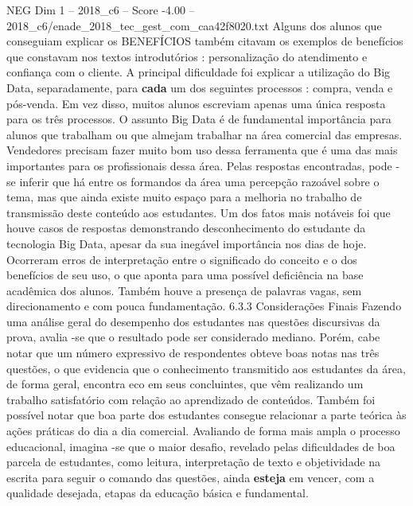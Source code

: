 \begin{textsample}{NEG Dim 1 – 2018\_c6 – Score -4.00 – 2018\_c6/enade\_2018\_tec\_gest\_com\_caa42f8020.txt}
Alguns dos alunos que conseguiam explicar os BENEFÍCIOS também citavam os exemplos de benefícios que constavam nos textos introdutórios : personalização do atendimento e confiança com o cliente.
A principal dificuldade foi explicar a utilização do Big Data, separadamente, para \textbf{cada} um dos seguintes processos : compra, venda e pós-venda.
Em vez disso, muitos alunos escreviam apenas uma única resposta para os três processos.
O assunto Big Data é de fundamental importância para alunos que trabalham ou que almejam trabalhar na área comercial das empresas.
Vendedores precisam fazer muito bom uso dessa ferramenta que é uma das mais importantes para os profissionais dessa área.
Pelas respostas encontradas, pode -se inferir que há entre os formandos da área uma percepção razoável sobre o tema, mas que ainda existe muito espaço para a melhoria no trabalho de transmissão deste conteúdo aos estudantes.
Um dos fatos mais notáveis foi que houve casos de respostas demonstrando desconhecimento do estudante da tecnologia Big Data, apesar da sua inegável importância nos dias de hoje.
Ocorreram erros de interpretação entre o significado do conceito e o dos benefícios de seu uso, o que aponta para uma possível deficiência na base acadêmica dos alunos.
Também houve a presença de palavras vagas, sem direcionamento e com pouca fundamentação. 6.3.3 Considerações Finais Fazendo uma análise geral do desempenho dos estudantes nas questões discursivas da prova, avalia -se que o resultado pode ser considerado mediano.
Porém, cabe notar que um número expressivo de respondentes obteve boas notas nas três questões, o que evidencia que o conhecimento transmitido aos estudantes da área, de forma geral, encontra eco em seus concluintes, que vêm realizando um trabalho satisfatório com relação ao aprendizado de conteúdos.
Também foi possível notar que boa parte dos estudantes consegue relacionar a parte teórica às ações práticas do dia a dia comercial.
Avaliando de forma mais ampla o processo educacional, imagina -se que o maior desafio, revelado pelas dificuldades de boa parcela de estudantes, como leitura, interpretação de texto e objetividade na escrita para seguir o comando das questões, ainda \textbf{esteja} em vencer, com a qualidade desejada, etapas da educação básica e fundamental.

\end{textsample}

